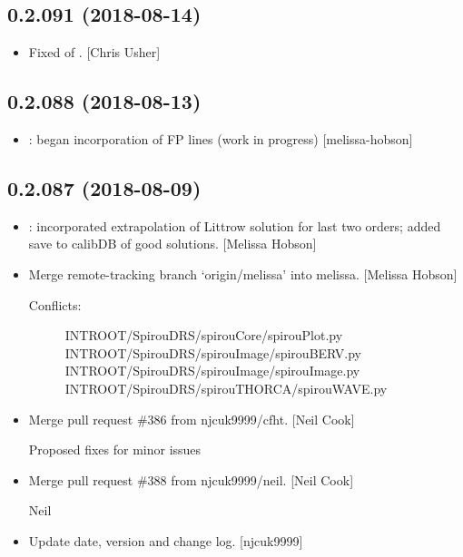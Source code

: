 \documentclass[a4paper,10pt,english]{report}
\begin{document}
\subsection{0.2.091 (2018-08-14)}
\label{\detokenize{misc/changelog:id373}}\begin{itemize}
\item {} 
Fixed  of . {[}Chris Usher{]}

\end{itemize}


\subsection{0.2.088 (2018-08-13)}
\label{\detokenize{misc/changelog:id374}}\begin{itemize}
\item {} 
: began incorporation of FP lines (work in
progress) {[}melissa-hobson{]}

\end{itemize}


\subsection{0.2.087 (2018-08-09)}
\label{\detokenize{misc/changelog:id375}}\begin{itemize}
\item {} 
: incorporated extrapolation of Littrow
solution for last two orders; added save to calibDB of good solutions.
{[}Melissa Hobson{]}

\item {} 
Merge remote-tracking branch ‘origin/melissa’ into melissa. {[}Melissa
Hobson{]}
\begin{description}
\item[{Conflicts:}] \leavevmode
INTROOT/SpirouDRS/spirouCore/spirouPlot.py
INTROOT/SpirouDRS/spirouImage/spirouBERV.py
INTROOT/SpirouDRS/spirouImage/spirouImage.py
INTROOT/SpirouDRS/spirouTHORCA/spirouWAVE.py

\end{description}

\item {} 
Merge pull request \#386 from njcuk9999/cfht. {[}Neil Cook{]}

Proposed fixes for minor issues

\item {} 
Merge pull request \#388 from njcuk9999/neil. {[}Neil Cook{]}

Neil

\item {} 
Update date, version and change log. {[}njcuk9999{]}

\end{itemize}
\end{document}
